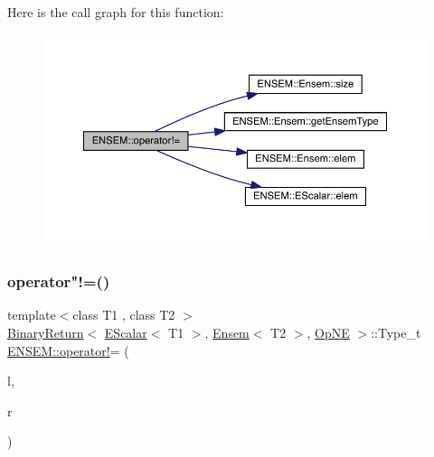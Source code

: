 Here is the call graph for this function\+:\nopagebreak
\begin{figure}[H]
\begin{center}
\leavevmode
\includegraphics[width=350pt]{d1/d9e/group__eensem_ga8086f697f52b0363688785b35a8cdca3_cgraph}
\end{center}
\end{figure}
\mbox{\label{group__eensem_ga312278f2450b3a4afdfd443566c93d0a}} 
\subsubsection{\texorpdfstring{operator"!=()}{operator!=()}\hspace{0.1cm}{\footnotesize\ttfamily [3/3]}}
{\footnotesize\ttfamily template$<$class T1 , class T2 $>$ \\
\mbox{\hyperlink{structENSEM_1_1BinaryReturn}{Binary\+Return}}$<$ \mbox{\hyperlink{classENSEM_1_1EScalar}{E\+Scalar}}$<$ T1 $>$, \mbox{\hyperlink{classENSEM_1_1Ensem}{Ensem}}$<$ T2 $>$, \mbox{\hyperlink{structENSEM_1_1OpNE}{Op\+NE}} $>$\+::Type\+\_\+t \mbox{\hyperlink{group__escalar_ga248e30ef2d97325ac4b11c077bc514dd}{E\+N\+S\+E\+M\+::operator!}}= (\begin{DoxyParamCaption}\item[{const \mbox{\hyperlink{classENSEM_1_1EScalar}{E\+Scalar}}$<$ T1 $>$ \&}]{l,  }\item[{const \mbox{\hyperlink{classENSEM_1_1Ensem}{Ensem}}$<$ T2 $>$ \&}]{r }\end{DoxyParamCaption})\hspace{0.3cm}{\ttfamily [inline]}}

